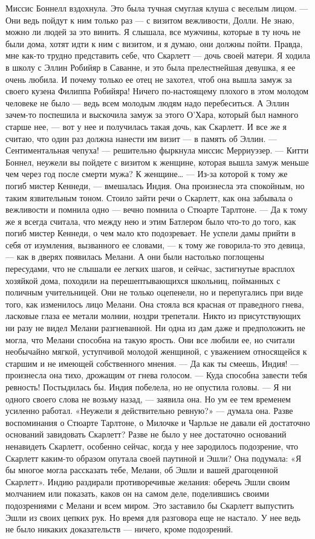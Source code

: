 Миссис Боннелл вздохнула. Это была тучная смуглая клуша с веселым лицом.
— Они ведь пойдут к ним только раз — с визитом вежливости, Долли. Не знаю, можно ли людей за это винить. Я слышала, все мужчины, которые в ту ночь не были дома, хотят идти к ним с визитом, и я думаю, они должны пойти. Правда, мне как-то трудно представить себе, что Скарлетт — дочь своей матери. Я ходила в школу с Эллин Робийяр в Саванне, и это была прелестнейшая девушка, я ее очень любила. И почему только ее отец не захотел, чтоб она вышла замуж за своего кузена Филиппа Робийяра! Ничего по-настоящему плохого в этом молодом человеке не было — ведь всем молодым людям надо перебеситься. А Эллин зачем-то поспешила и выскочила замуж за этого О’Хара, который был намного старше нее, — вот у нее и получилась такая дочь, как Скарлетт. И все же я считаю, что один раз должна нанести им визит — в память об Эллин.
— Сентиментальная чепуха! — решительно фыркнула миссис Мерриуэзер. — Китти Боннел, неужели вы пойдете с визитом к женщине, которая вышла замуж меньше чем через год после смерти мужа? К женщине…
— Из-за которой к тому же погиб мистер Кеннеди, — вмешалась Индия. Она произнесла эта спокойным, но таким язвительным тоном. Стоило зайти речи о Скарлетт, как она забывала о вежливости и помнила одно — вечно помнила о Стюарте Тарлтоне. — Да к тому же я всегда считала, что между нею и этим Батлером было что-то до того, как погиб мистер Кеннеди, о чем мало кто подозревает.
Не успели дамы прийти в себя от изумления, вызванного ее словами, — к тому же говорила-то это девица, — как в дверях появилась Мелани. А они были настолько поглощены пересудами, что не слышали ее легких шагов, и сейчас, застигнутые врасплох хозяйкой дома, походили на перешептывающихся школьниц, пойманных с поличным учительницей. Они не только оцепенели, но и перепугались при виде того, как изменилось лицо Мелани. Она стояла вся красная от праведного гнева, ласковые глаза ее метали молнии, ноздри трепетали. Никто из присутствующих ни разу не видел Мелани разгневанной. Ни одна из дам даже и предположить не могла, что Мелани способна на такую ярость. Они все любили ее, но считали необычайно мягкой, уступчивой молодой женщиной, с уважением относящейся к старшим и не имеющей собственного мнения.
— Да как ты смеешь, Индия! — произнесла она тихо, дрожащим от гнева голосом. — Куда способна завести тебя ревность! Постыдилась бы.
Индия побелела, но не опустила головы.
— Я ни одного своего слова не возьму назад, — заявила она. Но ум ее тем временем усиленно работал. «Неужели я действительно ревную?» — думала она. Разве воспоминания о Стюарте Тарлтоне, о Милочке и Чарльзе не давали ей достаточно оснований завидовать Скарлетт? Разве не было у нее достаточно оснований ненавидеть Скарлетт, особенно сейчас, когда у нее зародилось подозрение, что Скарлетт каким-то образом опутала своей паутиной и Эшли? Она подумала: «Я бы многое могла рассказать тебе, Мелани, об Эшли и вашей драгоценной Скарлетт». Индию раздирали противоречивые желания: оберечь Эшли своим молчанием или показать, каков он на самом деле, поделившись своими подозрениями с Мелани и всем миром. Это заставило бы Скарлетт выпустить Эшли из своих цепких рук. Но время для разговора еще не настало. У нее ведь не было никаких доказательств — ничего, кроме подозрений.
